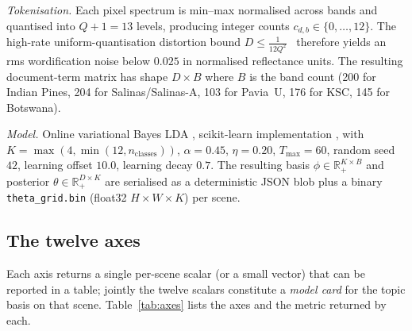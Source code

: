 \documentclass[journal,a4paper,10pt]{IEEEtran}
\begin{document}
\emph{Tokenisation.} Each pixel spectrum is min--max normalised
across bands and quantised into $Q + 1 = 13$ levels, producing
integer counts $c_{d,b} \in \{0, \ldots, 12\}$. The high-rate
uniform-quantisation distortion bound
$D \le \tfrac{1}{12 Q^2}$~\cite{gershogray1992vq} therefore yields
an rms wordification noise below $0.025$ in normalised reflectance
units. The resulting document-term matrix has shape $D \times B$
where $B$ is the band count (200 for Indian Pines, 204 for
Salinas/Salinas-A, 103 for Pavia~U, 176 for KSC, 145 for Botswana).

\emph{Model.} Online variational Bayes LDA
\cite{hoffman2010online}, scikit-learn implementation
\cite{pedregosa2011scikit}, with $K = \max(4, \min(12,
n_{\text{classes}}))$, $\alpha = 0.45$, $\eta = 0.20$,
$T_{\max} = 60$, random seed $42$, learning offset $10.0$,
learning decay $0.7$. The resulting basis $\phi \in \mathbb{R}_+^{K
\times B}$ and posterior $\theta \in \mathbb{R}_+^{D \times K}$ are
serialised as a deterministic JSON blob plus a binary
\texttt{theta\_grid.bin} (float32 $H \times W \times K$) per scene.

\subsection{The twelve axes}

Each axis returns a single per-scene scalar (or a small vector) that
can be reported in a table; jointly the twelve scalars constitute a
\emph{model card} for the topic basis on that scene.
Table~\ref{tab:axes} lists the axes and the metric returned by each.
\end{document}
